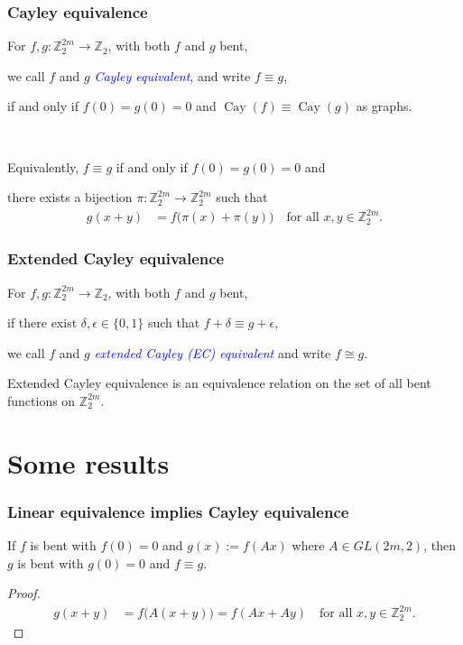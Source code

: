 \documentclass[pdf,sprung,slideColor,nocolorBG]{beamer}
\newenvironment{colortheme}[1]{
\def\ProvidesPackageRCS $##1${\relax}
\renewcommand{\ProcessOptions}{\relax}
\makeatletter

\makeatother
}{}
\newcommand{\mb}[1]{\mathbb{#1}}
\newcommand{\Emph}[1]{\emph{\textcolor{blue}{#1}}}
\newcommand{\To}{\rightarrow}
\newcommand{\Cay}[1]{\operatorname{Cay}\left(#1\right)}
\newcommand{\Z}{\mb{Z}}
\begin{document}
\begin{colortheme}{jubata}
\begin{frame}
\frametitle{Cayley equivalence}
\begin{Definition}
%
For $f, g : \Z_2^{2m} \To \Z_2$, with both $f$ and $g$ bent, 

we call $f$ and $g$ \Emph{Cayley equivalent},
and write $f \equiv g$, 

if and only if $f(0)=g(0)=0$ and $\Cay{f} \equiv \Cay{g}$ as graphs.

~

Equivalently, $f \equiv g$ if and only if $f(0)=g(0)=0$ and 

there exists a bijection $\pi : \Z_2^{2m} \To \Z_2^{2m}$ such that
\begin{align*}
g(x+y) &= f \big(\pi(x)+\pi(y)\big) \quad \text{for all~} x,y \in \Z_2^{2m}. 
\end{align*}
\end{Definition}
\end{frame}
\begin{frame}
\frametitle{Extended Cayley equivalence}
\begin{Definition}
For $f, g : \Z_2^{2m} \To \Z_2$, with both $f$ and $g$ bent,

if there exist $\delta, \epsilon \in \{0,1\}$ such that $f + \delta \equiv g + \epsilon$, 

we call $f$ and $g$ \Emph{extended Cayley (EC) equivalent} and write $f \cong g$. 
\end{Definition}
Extended Cayley equivalence is an equivalence relation on the set of all bent functions on $\Z_2^{2m}$.
\end{frame}
\section{Some results}

\begin{frame}
\frametitle{Linear equivalence implies Cayley equivalence}

\begin{Theorem}
If $f$ is bent with $f(0)=0$ and $g(x) := f(A x)$ where $A \in GL(2m,2)$,
then $g$ is bent with $g(0)=0$ and $f \equiv g$.
\end{Theorem}
\begin{proof}
\begin{align*}
g(x+y) &= f\big(A(x+y)\big) = f(A x + A y)\quad \text{for all~} x,y \in \Z_2^{2m}. 
\end{align*}
\end{proof}
 

\end{frame}
\end{colortheme}
\end{document}
